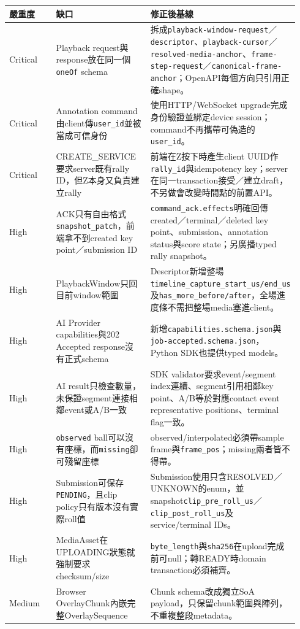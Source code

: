 \documentclass[
  9pt,
  a4paper,
]{article}
\begin{document}
\begin{longtable}[]{@{}>{\RaggedRight\arraybackslash}p{0.18\linewidth}>{\RaggedRight\arraybackslash}p{0.34\linewidth}>{\RaggedRight\arraybackslash}p{0.42\linewidth}@{}}
\toprule\noalign{}
嚴重度 & 缺口 & 修正後基線 \\
\midrule\noalign{}
\endhead
\bottomrule\noalign{}
\endlastfoot
Critical & Playback request與response放在同一個\texttt{oneOf} schema &
拆成\texttt{playback-window-request}／\texttt{descriptor}、\texttt{playback-cursor}／\texttt{resolved-media-anchor}、\texttt{frame-step-request}／\texttt{canonical-frame-anchor}；OpenAPI每個方向只引用正確shape。 \\
Critical & Annotation command由client傳\texttt{user\_\allowbreak{}id}並被當成可信身份
& 使用HTTP/WebSocket upgrade完成身份驗證並綁定device
session；command不再攜帶可偽造的\texttt{user\_\allowbreak{}id}。 \\
Critical & CREATE\_\allowbreak{}SERVICE要求server既有rally ID，但Z本身又負責建立rally
& 前端在Z按下時產生client UUID作\texttt{rally\_\allowbreak{}id}與idempotency
key；server在同一transaction接受／建立draft，不另做會改變時間點的前置API。 \\
High & ACK只有自由格式\texttt{snapshot\_\allowbreak{}patch}，前端拿不到created key
point／submission ID &
\texttt{command\_\allowbreak{}ack.effects}明確回傳created／terminal／deleted key
point、submission、annotation status與score state；另廣播typed rally
snapshot。 \\
High & PlaybackWindow只回目前window範圍 &
Descriptor新增整場\texttt{timeline\_\allowbreak{}capture\_\allowbreak{}start\_\allowbreak{}us/end\_\allowbreak{}us}及\texttt{has\_\allowbreak{}more\_\allowbreak{}before/after}，全場進度條不需把整場media塞進client。 \\
High & AI Provider capabilities與202 Accepted response沒有正式schema &
新增\texttt{capabilities.schema.json}與\texttt{job-accepted.schema.json}，Python
SDK也提供typed models。 \\
High & AI result只檢查數量，未保證segment連接相鄰event或A/B一致 & SDK
validator要求event/segment index連續、segment引用相鄰key
point、A/B等於對應contact event representative positions、terminal
flag一致。 \\
High & \texttt{observed}
ball可以沒有座標，而\texttt{missing}卻可殘留座標 &
observed/interpolated必須帶sample
frame與\texttt{frame\_\allowbreak{}pos}；missing兩者皆不得帶。 \\
High & Submission可保存\texttt{PENDING}，且clip
policy只有版本沒有實際roll值 &
Submission使用只含RESOLVED／UNKNOWN的enum，並snapshot\texttt{clip\_\allowbreak{}pre\_\allowbreak{}roll\_\allowbreak{}us}／\texttt{clip\_\allowbreak{}post\_\allowbreak{}roll\_\allowbreak{}us}及service/terminal
IDs。 \\
High & MediaAsset在UPLOADING狀態就強制要求checksum/size &
\texttt{byte\_\allowbreak{}length}與\texttt{sha256}在upload完成前可null；轉READY時domain
transaction必須補齊。 \\
Medium & Browser OverlayChunk內嵌完整OverlaySequence & Chunk
schema改成獨立SoA
payload，只保留chunk範圍與陣列，不重複整段metadata。 \\
\end{longtable}
\end{document}
